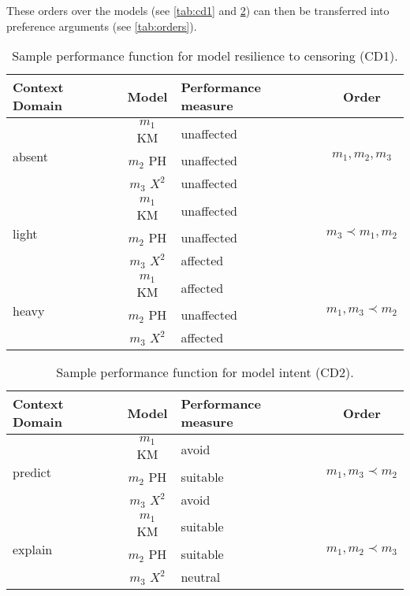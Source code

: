These orders over the models (see \autoref{tab:cd1} and \ref{tab:cd2}) can then be transferred into preference arguments (see \autoref{tab:orders}). 

\begin{table}[htbp]
	\centering
	\begin{tabular}{|l|c|l|c|}
	\hline
	Context Domain 			& Model 			& Performance measure & Order\\
	\hline\hline
	\multirow{3}{*}{absent} & $m_1$ KM 		& unaffected		& 	\multirow{3}{*}{$m_1, m_2, m_3$}\\
							& $m_2$ PH		& unaffected		&\\
							& $m_3$ $X^2$	& unaffected		&\\
	\hline
	\multirow{3}{*}{light} 	& $m_1$ KM 		& unaffected		& \multirow{3}{*}{$m_3 \prec m_1, m_2$}\\
							& $m_2$ PH		& unaffected		&\\
							& $m_3$ $X^2$	& affected		&\\
	\hline
	\multirow{3}{*}{heavy} 	& $m_1$ KM 		& affected		& \multirow{3}{*}{$m_1, m_3 \prec m_2$}\\
							& $m_2$ PH		& unaffected		&\\
							& $m_3$ $X^2$	& affected		&\\
	\hline
	\end{tabular}
	\caption{Sample performance function for model resilience to censoring (CD1).}
	\label{tab:cd1}
\end{table}


\begin{table}[htbp]
	\centering
	\begin{tabular}{|l|c|l|c|}
	\hline
	Context Domain 			& Model 			& Performance measure & Order\\
	\hline\hline
	\multirow{3}{*}{predict}& $m_1$ KM 		& avoid		& \multirow{3}{*}{$m_1, m_3 \prec m_2$}\\
							& $m_2$ PH		& suitable	&\\
							& $m_3$ $X^2$	& avoid		&\\
	\hline
	\multirow{3}{*}{explain}& $m_1$ KM 		& suitable	& \multirow{3}{*}{$m_1, m_2 \prec m_3$}\\
							& $m_2$ PH		& suitable	&\\
							& $m_3$ $X^2$	& neutral	&\\
	\hline
	\end{tabular}
	\caption{Sample performance function for model intent (CD2).}
	\label{tab:cd2}
\end{table}

